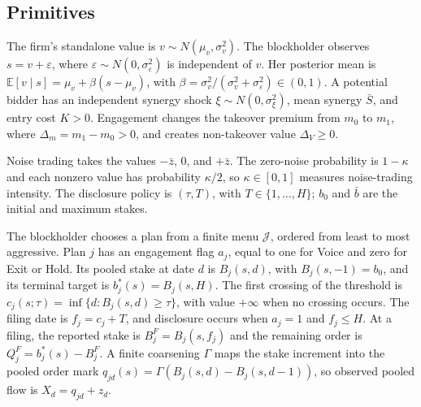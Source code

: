 \documentclass[11pt]{article}
\makeatletter
\newcommand{\compatlabel}[2]{\begingroup\phantomsection\def\@currentlabel{#1}\label{#2}\endgroup}
\newcommand{\Eop}{\mathbb{E}}
\makeatother
\begin{document}
\subsection{Primitives}
\label{sec:primitives}

\compatlabel{1}{def:primitives}
The firm's standalone value is $v \sim N(\mu_v,\sigma_v^2)$. The blockholder observes
$s=v+\varepsilon$, where $\varepsilon \sim N(0,\sigma_\varepsilon^2)$ is independent of $v$. Her
posterior mean is $\Eop[v\mid s]=\mu_v+\beta(s-\mu_v)$, with
$\beta=\sigma_v^2/(\sigma_v^2+\sigma_\varepsilon^2)\in(0,1)$. A potential bidder has an independent
synergy shock $\xi\sim N(0,\sigma_\xi^2)$, mean synergy $\bar S$, and entry cost $K>0$. Engagement
changes the takeover premium from $m_0$ to $m_1$, where $\Delta_m=m_1-m_0>0$, and creates non-takeover
value $\Delta_V\geq0$.

Noise trading takes the values $-\bar z$, $0$, and $+\bar z$. The zero-noise probability is
$1-\kappa$ and each nonzero value has probability $\kappa/2$, so $\kappa\in[0,1]$ measures
noise-trading intensity. The disclosure policy is $(\tau,T)$, with $T\in\{1,\ldots,H\}$; $b_0$ and
$\bar b$ are the initial and maximum stakes.

The blockholder chooses a plan from a finite menu $\mathcal J$, ordered from least to most aggressive.
Plan $j$ has an engagement flag $a_j$, equal to one for Voice and zero for Exit or Hold. Its pooled
stake at date $d$ is $B_j(s,d)$, with $B_j(s,-1)=b_0$, and its terminal target is
$b_j^*(s)=B_j(s,H)$. The first crossing of the threshold is
$c_j(s;\tau)=\inf\{d:B_j(s,d)\geq\tau\}$, with value $+\infty$ when no crossing occurs. The filing
date is $f_j=c_j+T$, and disclosure occurs when $a_j=1$ and $f_j\leq H$. At a filing, the reported
stake is $B_j^F=B_j(s,f_j)$ and the remaining order is $Q_j^F=b_j^*(s)-B_j^F$. A finite coarsening
$\Gamma$ maps the stake increment into the pooled order mark
$q_{jd}(s)=\Gamma(B_j(s,d)-B_j(s,d-1))$, so observed pooled flow is $X_d=q_{jd}+z_d$.
\compatlabel{2}{def:plans}
\end{document}
